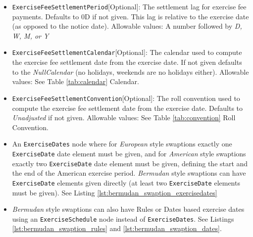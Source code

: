 \begin{itemize}
  Fees can either be given as an absolute amount or relative to the current notional of the period immediately following
  the exercise date using the \verb+type+ attribute together with specifiers \verb+Absolute+ resp. \verb+Percentage+. If
  not given, the type defaults to \verb+Absolute+. \verb+Percentage+ fees are expressed in decimal form, e.g. 0.05 is a fee of 5\% of notional.

  If a fee is given as a positive number the option holder has to pay a corresponding amount if they exercise the
  option. If the fee is negative on the other hand, the option holder receives an amount on the option exercise.

  Only supported for Swaptions and Callable Swaps currently.

\item \lstinline!ExerciseFeeSettlementPeriod![Optional]: The settlement lag for exercise fee payments. Defaults to 0D if not
  given. This lag is relative to the exercise date (as opposed to the notice date). Allowable values: A number followed by \emph{D, W, M, or Y}

\item \lstinline!ExerciseFeeSettlementCalendar![Optional]: The calendar used to compute the exercise fee settlement date from the
  exercise date. If not given defaults to the \emph{NullCalendar} (no holidays, weekends are no holidays either). Allowable values: See Table \ref{tab:calendar} Calendar.

\item \lstinline!ExerciseFeeSettlementConvention![Optional]: The roll convention used to compute the exercise fee settlement date from
  the exercise date. Defaults to \emph{Unadjusted} if not given. Allowable values: See Table \ref{tab:convention} Roll Convention.

\item An \lstinline!ExerciseDates! node where for \emph{European} style swaptions exactly one \lstinline!ExerciseDate! date element must be given, and for \emph{American} style swaptions  exactly two \lstinline!ExerciseDate! date element must be given, defining the start and the end of the American exercise period.  \emph{Bermudan} style swaptions can have \lstinline!ExerciseDate! elements given directly (at least two  \lstinline!ExerciseDate! elements must be given). See Listing \ref{lst:bermudan_swaption_exercisedates}

\item  \emph{Bermudan} style swaptions can also have Rules or Dates based exercise dates using an  \lstinline!ExerciseSchedule! node instead of  \lstinline!ExerciseDates!. See Listings \ref{lst:bermudan_swaption_rules} and \ref{lst:bermudan_swaption_dates}.



\end{itemize}
